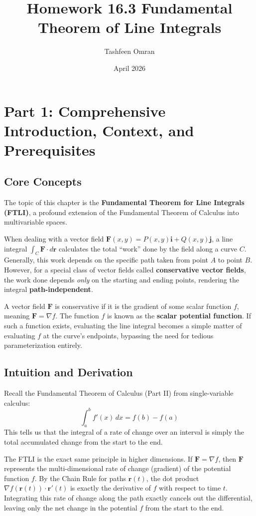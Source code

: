 \documentclass[12pt]{article}
\title{Homework 16.3 Fundamental Theorem of Line Integrals}
\author{Tashfeen Omran}
\date{April 2026}
\begin{document}
\maketitle
\tableofcontents
\newpage

\section{Part 1: Comprehensive Introduction, Context, and Prerequisites}

\subsection{Core Concepts}
The topic of this chapter is the \textbf{Fundamental Theorem for Line Integrals (FTLI)}, a profound extension of the Fundamental Theorem of Calculus into multivariable spaces. 

When dealing with a vector field $\mathbf{F}(x, y) = P(x, y)\mathbf{i} + Q(x, y)\mathbf{j}$, a line integral $\int_C \mathbf{F} \cdot d\mathbf{r}$ calculates the total ``work'' done by the field along a curve $C$. Generally, this work depends on the specific path taken from point $A$ to point $B$. However, for a special class of vector fields called \textbf{conservative vector fields}, the work done depends \textit{only} on the starting and ending points, rendering the integral \textbf{path-independent}. 

A vector field $\mathbf{F}$ is conservative if it is the gradient of some scalar function $f$, meaning $\mathbf{F} = \nabla f$. The function $f$ is known as the \textbf{scalar potential function}. If such a function exists, evaluating the line integral becomes a simple matter of evaluating $f$ at the curve's endpoints, bypassing the need for tedious parameterization entirely.

\subsection{Intuition and Derivation}
Recall the Fundamental Theorem of Calculus (Part II) from single-variable calculus: 
\[
\int_{a}^{b} f'(x) \, dx = f(b) - f(a)
\]
This tells us that the integral of a rate of change over an interval is simply the total accumulated change from the start to the end.

The FTLI is the exact same principle in higher dimensions. If $\mathbf{F} = \nabla f$, then $\mathbf{F}$ represents the multi-dimensional rate of change (gradient) of the potential function $f$. By the Chain Rule for paths $\mathbf{r}(t)$, the dot product $\nabla f(\mathbf{r}(t)) \cdot \mathbf{r}'(t)$ is exactly the derivative of $f$ with respect to time $t$. Integrating this rate of change along the path exactly cancels out the differential, leaving only the net change in the potential $f$ from the start to the end.
\end{document}
